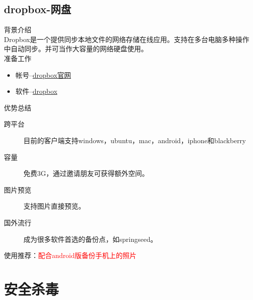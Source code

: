 \subsection{dropbox-网盘}
背景介绍\\

Dropbox是一个提供同步本地文件的网络存储在线应用。支持在多台电脑多种操作中自动同步。并可当作大容量的网络硬盘使用。\\
准备工作
\begin{itemize}
\item 帐号--\href{https://www.dropbox.com/}{dropbox官网}
\item 软件--\href{http://dropboxchina.com/Download/dropbox-for-windows.html}{dropbox}
\end{itemize} 
优势总结
\begin{description}
\item[跨平台] 目前的客户端支持windows，ubuntu，mac，android，iphone和blackberry
\item[容量] 免费3G，通过邀请朋友可获得额外空间。
\item[图片预览] 支持图片直接预览。
\item[国外流行] 成为很多软件首选的备份点，如springseed。
\end{description}
使用推荐：\textcolor{red}{配合android版备份手机上的照片}


\clearpage
\section{安全杀毒}
\clearpage














